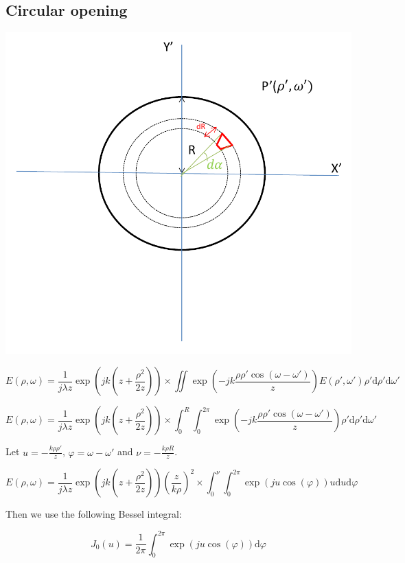 \documentclass[10pt,a4paper]{article}
\begin{document}
	\subsection{Circular opening}
\begin{center}
\includegraphics[scale=0.3]{../Ressources/schema-4-2.png}
\end{center}

\[
E(\rho,\omega)=\frac{1}{j\lambda z} \exp\left(jk\left(z+\frac{\rho^2}{2z}\right)\right)
\times \iint \exp\left(-jk\frac{\rho\rho'\cos(\omega-\omega')}{z}\right)
E(\rho',\omega')\rho' \mathrm{d}\rho'\mathrm{d}\omega'
\]

\[
E(\rho,\omega)=\frac{1}{j\lambda z} \exp\left(jk\left(z+\frac{\rho^2}{2z}\right)\right)
\times \int_0^R \int_0^{2\pi} \exp\left(-jk\frac{\rho\rho'\cos(\omega-\omega')}{z}\right)
\rho' \mathrm{d}\rho'\mathrm{d}\omega'
\]

Let $u=-\frac{k\rho\rho'}{z}$, $\varphi=\omega-\omega'$ and $\nu=-\frac{k\rho R}{z}$.

\[
E(\rho,\omega)=\frac{1}{j\lambda z} \exp\left(jk\left(z+\frac{\rho^2}{2z}\right)\right)
\left(\frac{z}{k\rho}\right)^2
\times \int_0^\nu \int_0^{2\pi} \exp\left(ju\cos(\varphi)\right)
u \mathrm{d}u\mathrm{d}\varphi
\]

Then we use the following Bessel integral:

\[J_0(u)=\frac{1}{2\pi}\int_0^{2\pi} \exp\left(ju\cos(\varphi)\right)\mathrm{d}\varphi\]
\end{document}

